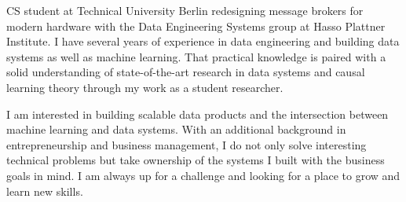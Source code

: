 

\begin{cvparagraph}

CS student at Technical University Berlin redesigning message brokers for modern hardware with the Data Engineering Systems group at Hasso Plattner Institute. I have several years of experience in data engineering and building data systems as well as machine learning. That practical knowledge is paired with a solid understanding of state-of-the-art research in data systems and causal learning theory through my work as a student researcher.  

I am interested in building scalable data products and the intersection between machine learning and data systems. With an additional background in entrepreneurship and business management, I do not only solve interesting technical problems but take ownership of the systems I built with the business goals in mind. I am always up for a challenge and looking for a place to grow and learn new skills.
\end{cvparagraph}
